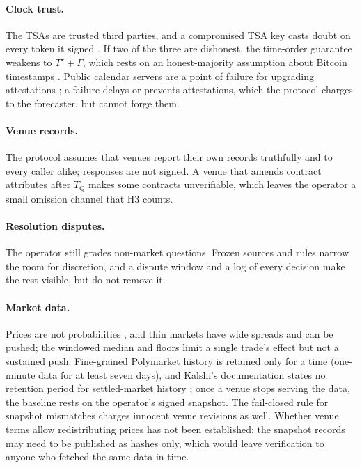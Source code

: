 \documentclass[11pt]{article}
\newcommand{\Ts}{T^{\star}}
\newcommand{\tQ}{T_{\mathrm{Q}}}
\begin{document}
\paragraph{Clock trust.} The TSAs are trusted third parties, and a compromised TSA key casts doubt on every token it signed \citep{rfc3161}. If two of the three are dishonest, the time-order guarantee weakens to $\Ts + \Gamma$, which rests on an honest-majority assumption about Bitcoin timestamps \citep{szalachowski2018timestamps}. Public calendar servers are a point of failure for upgrading attestations \citep{todd2016ots}; a failure delays or prevents attestations, which the protocol charges to the forecaster, but cannot forge them.

\paragraph{Venue records.} The protocol assumes that venues report their own records truthfully and to every caller alike; responses are not signed. A venue that amends contract attributes after $\tQ$ makes some contracts unverifiable, which leaves the operator a small omission channel that H3 counts.

\paragraph{Resolution disputes.} The operator still grades non-market questions. Frozen sources and rules narrow the room for discretion, and a dispute window and a log of every decision make the rest visible, but do not remove it.

\paragraph{Market data.} Prices are not probabilities \citep{manski2006}, and thin markets have wide spreads and can be pushed; the windowed median and floors limit a single trade's effect but not a sustained push. Fine-grained Polymarket history is retained only for a time (one-minute data for at least seven days), and Kalshi's documentation states no retention period for settled-market history \citep{polymarket_prices,kalshi_historical}; once a venue stops serving the data, the baseline rests on the operator's signed snapshot. The fail-closed rule for snapshot mismatches charges innocent venue revisions as well. Whether venue terms allow redistributing prices has not been established; the snapshot records may need to be published as hashes only, which would leave verification to anyone who fetched the same data in time.
\end{document}
